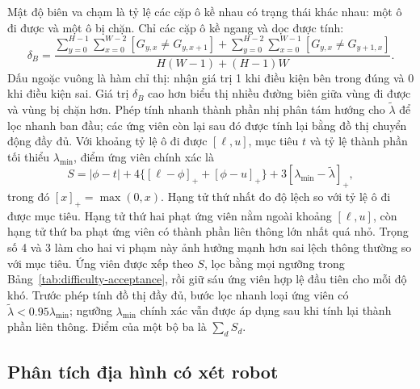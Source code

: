 \documentclass[11pt]{article}
\begin{document}
Mật độ biên va chạm là tỷ lệ các cặp ô kề nhau có trạng thái khác nhau: một ô
đi được và một ô bị chặn. Chỉ các cặp ô kề ngang và dọc được tính:
\begin{equation}
  \delta_B=\frac{
  \sum_{y=0}^{H-1}\sum_{x=0}^{W-2}[G_{y,x}\ne G_{y,x+1}]+
  \sum_{y=0}^{H-2}\sum_{x=0}^{W-1}[G_{y,x}\ne G_{y+1,x}]}
  {H(W-1)+(H-1)W}.
\end{equation}
Dấu ngoặc vuông là hàm chỉ thị: nhận giá trị 1 khi điều kiện bên trong đúng và
0 khi điều kiện sai. Giá trị $\delta_B$ cao hơn biểu thị nhiều đường biên giữa
vùng đi được và vùng bị chặn hơn. Phép tính nhanh thành phần nhị phân tám hướng
cho $\widetilde\lambda$ để lọc nhanh ban đầu; các ứng viên còn lại sau đó được
tính lại bằng đồ thị chuyển động đầy đủ. Với khoảng tỷ lệ ô đi được $[\ell,u]$,
mục tiêu $t$ và tỷ lệ thành phần tối thiểu $\lambda_{\min}$, điểm ứng viên chính
xác là
\begin{equation}
  S=|\phi-t|+4\{[\ell-\phi]_+ +[\phi-u]_+\}
  +3[\lambda_{\min}-\widetilde\lambda]_+,
\end{equation}
trong đó $[x]_+=\max(0,x)$. Hạng tử thứ nhất đo độ lệch so với tỷ lệ ô đi được
mục tiêu. Hạng tử thứ hai phạt ứng viên nằm ngoài khoảng $[\ell,u]$, còn hạng
tử thứ ba phạt ứng viên có thành phần liên thông lớn nhất quá nhỏ. Trọng số 4
và 3 làm cho hai vi phạm này ảnh hưởng mạnh hơn sai lệch thông thường so với
mục tiêu. Ứng viên được xếp theo $S$, lọc bằng mọi ngưỡng
trong Bảng~\ref{tab:difficulty-acceptance}, rồi giữ sáu ứng viên hợp lệ đầu tiên
cho mỗi độ khó. Trước phép tính đồ thị đầy đủ, bước lọc nhanh loại ứng viên
có $\widetilde\lambda<0.95\lambda_{\min}$; ngưỡng $\lambda_{\min}$ chính xác
vẫn được áp dụng sau khi tính lại thành phần liên thông. Điểm của một bộ ba là
$\sum_d S_d$.

\subsection{Phân tích địa hình có xét robot}
\end{document}
